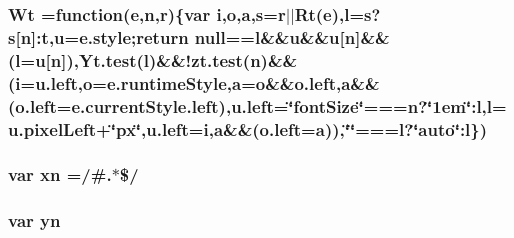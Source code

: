 \hypertarget{jquery-1_810_82_8min_8js_acf437e7551a2ce881d7ec2b66e46dc17}{
\subsubsection[{Wt}]{\setlength{\rightskip}{0pt plus 5cm}Wt =function({\bf e},n,r)\{var i,o,{\bf a},s=r$\vert$$\vert$Rt({\bf e}),l=s?s\mbox{[}n\mbox{]}\-:{\bf t},u={\bf e.\-style};return null==l\&\&u\&\&u\mbox{[}n\mbox{]}\&\&(l=u\mbox{[}n\mbox{]}),Yt.\-test(l)\&\&!zt.\-test(n)\&\&(i=u.\-left,o=e.\-runtime\-Style,{\bf a}=o\&\&o.\-left,{\bf a}\&\&(o.\-left=e.\-current\-Style.\-left),u.\-left=\char`\"{}font\-Size\char`\"{}===n?\char`\"{}1em\char`\"{}\-:l,l=u.\-pixel\-Left+\char`\"{}px\char`\"{},u.\-left=i,a\&\&(o.\-left=a)),\char`\"{}\char`\"{}===l?\char`\"{}auto\char`\"{}\-:l\})}}\label{jquery-1_810_82_8min_8js_acf437e7551a2ce881d7ec2b66e46dc17}
\hypertarget{jquery-1_810_82_8min_8js_a5d600963c6441f15f548bc0b847b6a04}{
\subsubsection[{xn}]{\setlength{\rightskip}{0pt plus 5cm}var xn =/\#.$\ast$\$/}}\label{jquery-1_810_82_8min_8js_a5d600963c6441f15f548bc0b847b6a04}
\hypertarget{jquery-1_810_82_8min_8js_a390d7ca752a48e31e8ffb5209c0a4cd6}{
\subsubsection[{yn}]{\setlength{\rightskip}{0pt plus 5cm}var yn}}\label{jquery-1_810_82_8min_8js_a390d7ca752a48e31e8ffb5209c0a4cd6}
